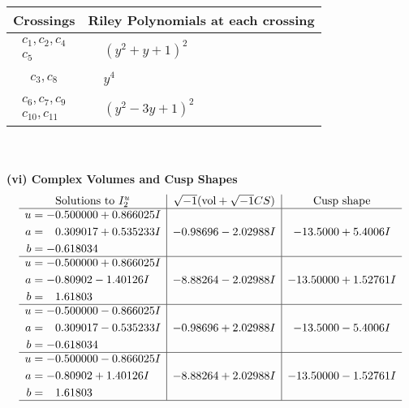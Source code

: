 \documentclass[1p]{elsarticle_modified}
\theoremstyle{definition}
\newcommand{\I}{\sqrt{-1}}
\begin{document}
\begin{tabular}{m{50pt}|m{274pt}}
Crossings & \hspace{64pt}Riley Polynomials at each crossing \\
\hline $$\begin{aligned}c_{1},c_{2},c_{4}\\c_{5}\end{aligned}$$&$\begin{aligned}
&(y^2+y+1)^2
\end{aligned}$\\
\hline $$\begin{aligned}c_{3},c_{8}\end{aligned}$$&$\begin{aligned}
&y^4
\end{aligned}$\\
\hline $$\begin{aligned}c_{6},c_{7},c_{9}\\c_{10},c_{11}\end{aligned}$$&$\begin{aligned}
&(y^2-3 y+1)^2
\end{aligned}$\\
\hline
\end{tabular}\\~\\
\newpage\flushleft \textbf{(vi) Complex Volumes and Cusp Shapes}
$$\begin{array}{c|c|c}  
\text{Solutions to }I^u_{2}& \I (\text{vol} + \sqrt{-1}CS) & \text{Cusp shape}\\
 \hline 
\begin{aligned}
u &= -0.500000 + 0.866025 I \\
a &= \phantom{-}0.309017 + 0.535233 I \\
b &= -0.618034\phantom{ +0.000000I}\end{aligned}
 & -0.98696 - 2.02988 I & -13.5000 + 5.4006 I \\ \hline\begin{aligned}
u &= -0.500000 + 0.866025 I \\
a &= -0.80902 - 1.40126 I \\
b &= \phantom{-}1.61803\phantom{ +0.000000I}\end{aligned}
 & -8.88264 - 2.02988 I & -13.50000 + 1.52761 I \\ \hline\begin{aligned}
u &= -0.500000 - 0.866025 I \\
a &= \phantom{-}0.309017 - 0.535233 I \\
b &= -0.618034\phantom{ +0.000000I}\end{aligned}
 & -0.98696 + 2.02988 I & -13.5000 - 5.4006 I \\ \hline\begin{aligned}
u &= -0.500000 - 0.866025 I \\
a &= -0.80902 + 1.40126 I \\
b &= \phantom{-}1.61803\phantom{ +0.000000I}\end{aligned}
 & -8.88264 + 2.02988 I & -13.50000 - 1.52761 I\\
 \hline 
 \end{array}$$\newpage
\end{document}
